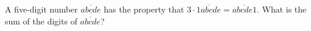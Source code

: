 A five-digit number $\overline{abcde}$ has the property that $3\cdot\overline{1abcde}=\overline{abcde1}$. What is the sum of the digits of $\overline{abcde}$?

